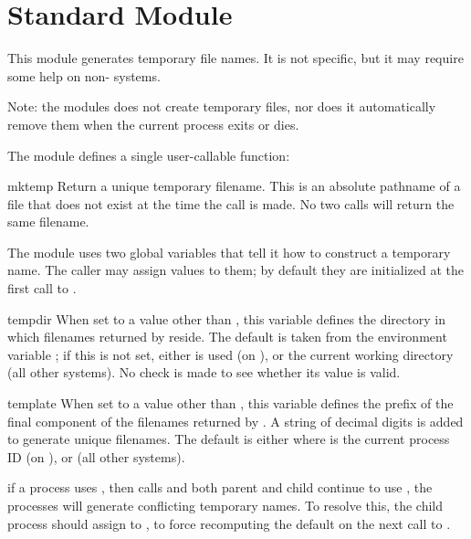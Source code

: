 \section{Standard Module }
\label{module-tempfile}


This module generates temporary file names.  It is not \UNIX{} specific,
but it may require some help on non-\UNIX{} systems.

Note: the modules does not create temporary files, nor does it
automatically remove them when the current process exits or dies.

The module defines a single user-callable function:

\begin{funcdesc}{mktemp}{}
Return a unique temporary filename.  This is an absolute pathname of a
file that does not exist at the time the call is made.  No two calls
will return the same filename.
\end{funcdesc}

The module uses two global variables that tell it how to construct a
temporary name.  The caller may assign values to them; by default they
are initialized at the first call to .

\begin{datadesc}{tempdir}
When set to a value other than , this variable defines the
directory in which filenames returned by  reside.
The default is taken from the environment variable ; if
this is not set, either  is used (on \UNIX{}), or the
current working directory (all other systems).  No check is made to
see whether its value is valid.
\end{datadesc}

\begin{datadesc}{template}
When set to a value other than , this variable defines the
prefix of the final component of the filenames returned by
.  A string of decimal digits is added to generate
unique filenames.  The default is either  where
 is the current process ID (on \UNIX{}), or  (all
other systems).
\end{datadesc}

 if a \UNIX{} process uses , then
calls  and both parent and child continue to use
, the processes will generate conflicting temporary
names.  To resolve this, the child process should assign 
to , to force recomputing the default on the next call
to .
